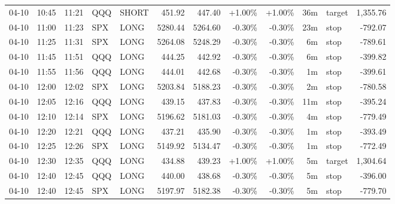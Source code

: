 \documentclass[11pt,a4paper]{article}
\begin{document}
\begin{center}
\begin{longtable}{>{\color{txtmain}}l l l l l r r r r r >{\color{txtmain}}l r}
04-10 & 10:45 & 11:21 & QQQ & SHORT & 451.92 & 447.40 & \textcolor{wingreen}{+1.00\%} & \textcolor{wingreen}{+1.00\%} & 36m & target & \textcolor{wingreen}{1,355.76} \\
04-10 & 11:00 & 11:23 & SPX & LONG & 5280.44 & 5264.60 & \textcolor{lossred}{-0.30\%} & \textcolor{lossred}{-0.30\%} & 23m & stop & \textcolor{lossred}{-792.07} \\
04-10 & 11:25 & 11:31 & SPX & LONG & 5264.08 & 5248.29 & \textcolor{lossred}{-0.30\%} & \textcolor{lossred}{-0.30\%} & 6m & stop & \textcolor{lossred}{-789.61} \\
04-10 & 11:45 & 11:51 & QQQ & LONG & 444.25 & 442.92 & \textcolor{lossred}{-0.30\%} & \textcolor{lossred}{-0.30\%} & 6m & stop & \textcolor{lossred}{-399.82} \\
04-10 & 11:55 & 11:56 & QQQ & LONG & 444.01 & 442.68 & \textcolor{lossred}{-0.30\%} & \textcolor{lossred}{-0.30\%} & 1m & stop & \textcolor{lossred}{-399.61} \\
04-10 & 12:00 & 12:02 & SPX & LONG & 5203.84 & 5188.23 & \textcolor{lossred}{-0.30\%} & \textcolor{lossred}{-0.30\%} & 2m & stop & \textcolor{lossred}{-780.58} \\
04-10 & 12:05 & 12:16 & QQQ & LONG & 439.15 & 437.83 & \textcolor{lossred}{-0.30\%} & \textcolor{lossred}{-0.30\%} & 11m & stop & \textcolor{lossred}{-395.24} \\
04-10 & 12:10 & 12:14 & SPX & LONG & 5196.62 & 5181.03 & \textcolor{lossred}{-0.30\%} & \textcolor{lossred}{-0.30\%} & 4m & stop & \textcolor{lossred}{-779.49} \\
04-10 & 12:20 & 12:21 & QQQ & LONG & 437.21 & 435.90 & \textcolor{lossred}{-0.30\%} & \textcolor{lossred}{-0.30\%} & 1m & stop & \textcolor{lossred}{-393.49} \\
04-10 & 12:25 & 12:26 & SPX & LONG & 5149.92 & 5134.47 & \textcolor{lossred}{-0.30\%} & \textcolor{lossred}{-0.30\%} & 1m & stop & \textcolor{lossred}{-772.49} \\
04-10 & 12:30 & 12:35 & QQQ & LONG & 434.88 & 439.23 & \textcolor{wingreen}{+1.00\%} & \textcolor{wingreen}{+1.00\%} & 5m & target & \textcolor{wingreen}{1,304.64} \\
04-10 & 12:40 & 12:45 & QQQ & LONG & 440.00 & 438.68 & \textcolor{lossred}{-0.30\%} & \textcolor{lossred}{-0.30\%} & 5m & stop & \textcolor{lossred}{-396.00} \\
04-10 & 12:40 & 12:45 & SPX & LONG & 5197.97 & 5182.38 & \textcolor{lossred}{-0.30\%} & \textcolor{lossred}{-0.30\%} & 5m & stop & \textcolor{lossred}{-779.70} \\

\end{longtable}
\end{center}
\end{document}

